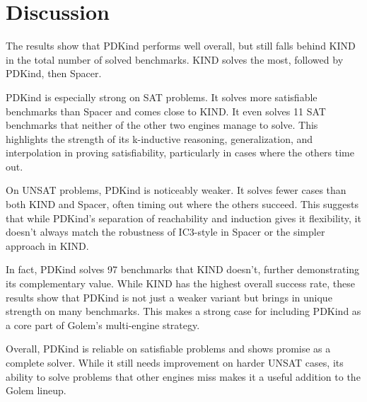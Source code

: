 \section{Discussion}
\noindent The results show that PDKind performs well overall, but still falls
behind KIND in the total number of solved benchmarks. KIND solves the most,
followed by PDKind, then Spacer.

PDKind is especially strong on SAT problems. It solves more satisfiable
benchmarks than Spacer and comes close to KIND. It even solves 11 SAT
benchmarks that neither of the other two engines manage to solve. This
highlights the strength of its k-inductive reasoning, generalization, and
interpolation in proving satisfiability, particularly in cases where the others
time out.

On UNSAT problems, PDKind is noticeably weaker. It solves fewer cases than both
KIND and Spacer, often timing out where the others
succeed. This suggests that while PDKind’s separation of reachability and
induction gives it flexibility, it doesn’t always match the robustness of
IC3-style in Spacer or the simpler approach in KIND.

In fact, PDKind solves 97 benchmarks that KIND doesn’t, further
demonstrating its complementary value. While KIND has the highest overall
success rate, these results show that PDKind is not just a weaker variant but
brings in unique strength on many benchmarks. This makes a strong case for
including PDKind as a core part of Golem’s multi-engine strategy.

\noindent Overall, PDKind is reliable on satisfiable problems and shows promise
as a complete solver. While it still needs improvement on harder UNSAT cases,
its ability to solve problems that other engines miss makes it a useful
addition to the Golem lineup.
